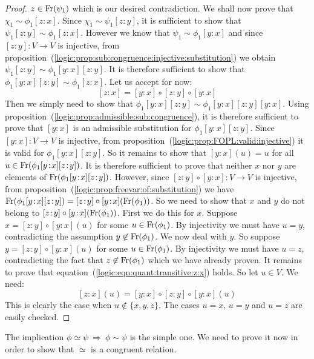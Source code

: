 \begin{proof}
$z\in\mbox{\rm Fr}(\psi_{1})$ which is our desired contradiction. We shall
now prove that $\chi_{1}\sim\phi_{1}[z\!:\!x]$. Since
$\chi_{1}\sim\psi_{1}[z\!:\!y]$, it is sufficient to show that
$\psi_{1}[z\!:\!y]\sim\phi_{1}[z\!:\!x]$. However we know that
$\psi_{1}\sim\phi_{1}[y\!:\!x]$ and since $[z\!:\!y]:V\to V$ is
injective, from
proposition~(\ref{logic:prop:sub:congruence:injective:substitution})
we obtain $\psi_{1}[z\!:\!y]\sim\phi_{1}[y\!:\!x][z\!:\!y]$. It is
therefore sufficient to show that
$\phi_{1}[y\!:\!x][z\!:\!y]\sim\phi_{1}[z\!:\!x]$. Let us accept for
now:
    \begin{equation}\label{logic:eqn:quant:transitive:z:x}
    [z\!:\!x]=[y\!:\!x]\circ[z\!:\!y]\circ[y\!:\!x]
    \end{equation}
Then we simply need to show that
$\phi_{1}[y\!:\!x][z\!:\!y]\sim\phi_{1}[y\!:\!x][z\!:\!y][y\!:\!x]$.
Using proposition~(\ref{logic:prop:admissible:sub:congruence}), it
is therefore sufficient to prove that $[y\!:\!x]$ is an admissible
substitution for $\phi_{1}[y\!:\!x][z\!:\!y]$. Since $[y\!:\!x]:V\to
V$ is injective, from
proposition~(\ref{logic:prop:FOPL:valid:injective}) it is valid for
$\phi_{1}[y\!:\!x][z\!:\!y]$. So it remains to show that
$[y\!:\!x](u)=u$ for all $u\in\mbox{\rm Fr}(\phi_{1}[y\!:\!x][z\!:\!y])$. It
is therefore sufficient to prove that neither $x$ nor $y$ are
elements of $\mbox{\rm Fr}(\phi_{1}[y\!:\!x][z\!:\!y])$. However, since
$[z\!:\!y]\circ[y\!:\!x]:V\to V$ is injective, from
proposition~(\ref{logic:prop:freevar:of:substitution}) we have
$\free(\phi_{1}[y\!:\!x][z\!:\!y])=[z\!:\!y]\circ[y\!:\!x](\free(\phi_{1}))$.
So we need to show that $x$ and $y$ do not belong to
$[z\!:\!y]\circ[y\!:\!x](\mbox{\rm Fr}(\phi_{1}))$. First we do this for
$x$. Suppose $x=[z\!:\!y]\circ[y\!:\!x](u)$ for some
$u\in\mbox{\rm Fr}(\phi_{1})$. By injectivity we must have $u=y$,
contradicting the assumption $y\not\in\mbox{\rm Fr}(\phi_{1})$. We now deal
with $y$. So suppose $y=[z\!:\!y]\circ[y\!:\!x](u)$ for some
$u\in\mbox{\rm Fr}(\phi_{1})$. By injectivity we must have $u=z$,
contradicting the fact that $z\not\in\mbox{\rm Fr}(\phi_{1})$ which we have
already proven. It remains to prove that
equation~(\ref{logic:eqn:quant:transitive:z:x}) holds. So let $u\in
V$. We need:
    \[
    [z\!:\!x](u)=[y\!:\!x]\circ[z\!:\!y]\circ[y\!:\!x](u)
    \]
This is clearly the case when $u\not\in\{x,y,z\}$. The cases $u=x$,
$u=y$ and $u=z$ are easily checked.
\end{proof}

The implication $\phi\simeq\psi\ \Rightarrow\ \phi\sim\psi$ is the
simple one. We need to prove it now in order to show that $\simeq$
is a congruent relation.

